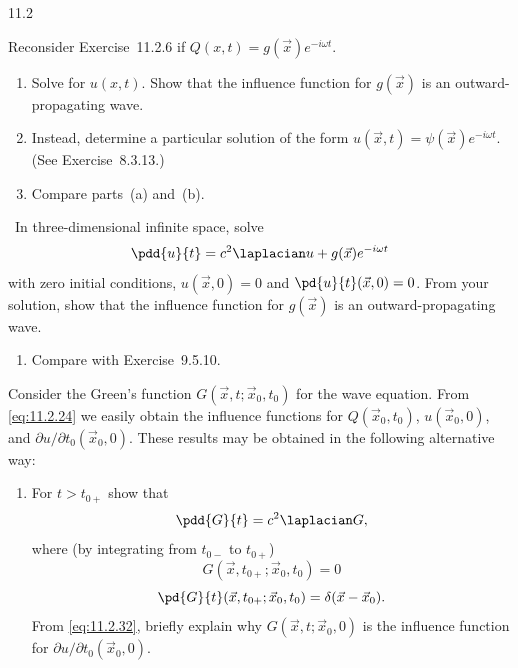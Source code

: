 \begin{exercises}{11.2}
\item \label{ex:11.2.7}
Reconsider Exercise~11.2.6 if $Q(x,t) = g(\vec{x})e^{-i\omega t}$.
\begin{enumerate}
\item[\starred (a)] Solve for $u(x,t)$.  Show that the influence function for $g(\vec{x})$ is an outward-propagating wave.
\item[(b)] Instead, determine a particular solution of the form $u(\vec{x},t) = \psi(\vec{x})e^{-i\omega t}$.  (See Exercise~8.3.13.)
\item[(c)] Compare parts~(a) and~(b).
\end{enumerate}

\item \label{ex:11.2.8}
\starred\ In three-dimensional infinite space, solve
\[
\pdd{u}{t} = c^2\laplacian u + g(\vec{x})e^{-i\omega t}
\]
with zero initial conditions, $u(\vec{x},0) = 0$ and $\pd{u}{t}(\vec{x},0) = 0$.  From your solution, show that the influence function for $g(\vec{x})$ is an outward-propagating wave.
\begin{enumerate}
\item[(b)] Compare with Exercise~9.5.10.
\end{enumerate}

\item \label{ex:11.2.9}
Consider the Green's function $G(\vec{x},t;\vec{x}_0,t_0)$ for the wave equation.  From \eqref{eq:11.2.24} we easily obtain the influence functions for $Q(\vec{x}_0,t_0)$, $u(\vec{x}_0,0)$, and $\partial u/\partial t_0(\vec{x}_0,0)$.  These results may be obtained in the following alternative way:
\begin{enumerate}
\item[(a)] For $t > t_{0+}$ show that
\begin{equation}
\label{eq:11.2.43}
\pdd{G}{t} = c^2\laplacian G,
\end{equation}
where (by integrating from $t_{0-}$ to $t_{0+}$)
\begin{equation}
\label{eq:11.2.44}
G(\vec{x},t_{0+};\vec{x}_0,t_0) = 0
\end{equation}
\begin{equation}
\label{eq:11.2.45}
\pd{G}{t}(\vec{x},t_{0+};\vec{x}_0,t_0) = \delta(\vec{x} - \vec{x}_0).
\end{equation}
From \eqref{eq:11.2.32}, briefly explain why $G(\vec{x},t;\vec{x}_0,0)$ is the influence function for $\partial u/\partial t_0(\vec{x}_0,0)$.


\end{enumerate}
\end{exercises}
